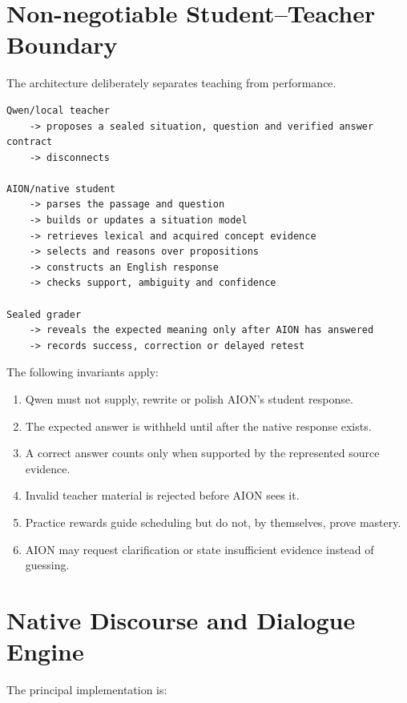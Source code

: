 \documentclass[11pt,a4paper]{article}
\begin{document}
\section{Non-negotiable Student--Teacher Boundary}

The architecture deliberately separates teaching from performance.

\begin{lstlisting}
Qwen/local teacher
    -> proposes a sealed situation, question and verified answer contract
    -> disconnects

AION/native student
    -> parses the passage and question
    -> builds or updates a situation model
    -> retrieves lexical and acquired concept evidence
    -> selects and reasons over propositions
    -> constructs an English response
    -> checks support, ambiguity and confidence

Sealed grader
    -> reveals the expected meaning only after AION has answered
    -> records success, correction or delayed retest
\end{lstlisting}

The following invariants apply:

\begin{enumerate}
  \item Qwen must not supply, rewrite or polish AION's student response.
  \item The expected answer is withheld until after the native response exists.
  \item A correct answer counts only when supported by the represented source evidence.
  \item Invalid teacher material is rejected before AION sees it.
  \item Practice rewards guide scheduling but do not, by themselves, prove mastery.
  \item AION may request clarification or state insufficient evidence instead of guessing.
\end{enumerate}

\section{Native Discourse and Dialogue Engine}

The principal implementation is:

\begin{center}
\end{center}
\end{document}
